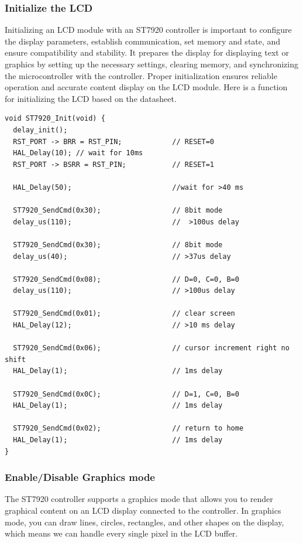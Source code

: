 \documentclass[a4paper, twoside]{report}
\begin{document}
\subsubsection{Initialize the LCD}
Initializing an LCD module with an ST7920 controller is important to configure the display parameters, establish communication, set memory and state, and ensure compatibility and stability. It prepares the display for displaying text or graphics by setting up the necessary settings, clearing memory, and synchronizing the microcontroller with the controller. Proper initialization ensures reliable operation and accurate content display on the LCD module. Here is a function for initializing the LCD based on the datasheet. 

\begin{verbatim}
void ST7920_Init(void) {
  delay_init();
  RST_PORT -> BRR = RST_PIN;            // RESET=0
  HAL_Delay(10); // wait for 10ms
  RST_PORT -> BSRR = RST_PIN;           // RESET=1

  HAL_Delay(50);                        //wait for >40 ms

  ST7920_SendCmd(0x30);                 // 8bit mode
  delay_us(110);                        //  >100us delay

  ST7920_SendCmd(0x30);                 // 8bit mode
  delay_us(40);                         // >37us delay

  ST7920_SendCmd(0x08);                 // D=0, C=0, B=0
  delay_us(110);                        // >100us delay

  ST7920_SendCmd(0x01);                 // clear screen
  HAL_Delay(12);                        // >10 ms delay

  ST7920_SendCmd(0x06);                 // cursor increment right no shift
  HAL_Delay(1);                         // 1ms delay

  ST7920_SendCmd(0x0C);                 // D=1, C=0, B=0
  HAL_Delay(1);                         // 1ms delay

  ST7920_SendCmd(0x02);                 // return to home
  HAL_Delay(1);                         // 1ms delay
}
\end{verbatim}

\subsubsection{Enable/Disable Graphics mode}
The ST7920 controller supports a graphics mode that allows you to render graphical content on an LCD display connected to the controller. In graphics mode, you can draw lines, circles, rectangles, and other shapes on the display, which means we can handle every single pixel in the LCD buffer. 
\end{document}
